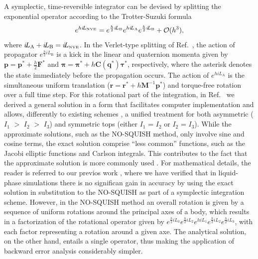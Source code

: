 \documentclass[
journal=jctcce,
layout=twocolumn
]{achemso}
\newcommand{\mt}[1]{\boldsymbol{\mathbf{#1}}}   %
\newcommand{\vt}[1]{\boldsymbol{\mathbf{#1}}}   %
\newcommand{\Liu}[1]{i\!L_\text{#1}}            %
\newcommand{\timestep}{h}
\begin{document}
A symplectic, time-reversible integrator can be devised by splitting the exponential operator according to the Trotter-Suzuki formula \cite{Trotter_1959, Suzuki_1976}
\begin{equation}
\label{eq:splitting NVE}
e^{\timestep \Liu{\tiny NVE}} = e^{\frac{\timestep}{2} \Liu{B}} e^{\timestep \Liu{A}} e^{\frac{\timestep}{2} \Liu{B}} + \mathcal{O}(\timestep^3),
\end{equation}
where $\Liu{A} + \Liu{B} = \Liu{\tiny NVE}$.
In the Verlet-type splitting of Ref.~, the action of propagator $e^{\frac{\timestep}{2} \Liu{B}}$ is a kick in the linear and quaternion momenta given by ${\vt p} = {\vt p}^\ast + \frac{\timestep}{2} {\vt F}^\ast$ and ${\vt \pi} = {\vt \pi}^\ast + \timestep {\mt C}({\vt q^\ast}) {\vt \tau}^\ast$, respectively, where the asterisk denotes the state immediately before the propagation occurs.
The action of $e^{\timestep \Liu{A}}$ is the simultaneous uniform translation (${\vt r} = {\vt r}^\ast + \timestep {\mt M}^{-1} {\vt p}^\ast$) and torque-free rotation over a full time step. For this rotational part of the integration, in Ref.~\cite{Silveira_2017} we derived a general solution in a form that facilitates computer implementation and allows, differently to existing schemes \cite{Kosenko_1998,vanZon2007,Celledoni_2008}, a unified treatment for both asymmetric ($I_1$ $>$ $I_2$ $>$ $I_3$) and symmetric tops (either $I_1$ = $I_2$ or $I_2$ = $I_3$).
While the approximate solutions, such as the NO-SQUISH \cite{Miller_2002} method, only involve sine and cosine terms, the exact solution comprise ``less common'' functions, such as the Jacobi elliptic functions and Carlson integrals.
This contributes to the fact that the approximate solution is more commonly used \cite{vanZon2007}. 
For mathematical details, the reader is referred to our previos work \cite{Silveira_2017}, where we have verified that in liquid-phase simulations there is no significan gain in accuracy by using the exact solution in substitution to the NO-SQUISH as part of a symplectic integration scheme.
However, in the NO-SQUISH method an overall rotation is given by a sequence of uniform rotations around the principal axes of a body, which results in a factorization of the rotational operator given by $ e^{\frac{h}{2} i\!L_3} e^{\frac{h}{2} i\!L_2} e^{h i\!L_1} e^{\frac{h}{2} i\!L_2} e^{\frac{h}{2} i\!L_3}$, with each factor representing a rotation around a given axe. The analytical solution, on the other hand, entails a single operator, thus making the application of backward error analysis considerably simpler.
\end{document}
